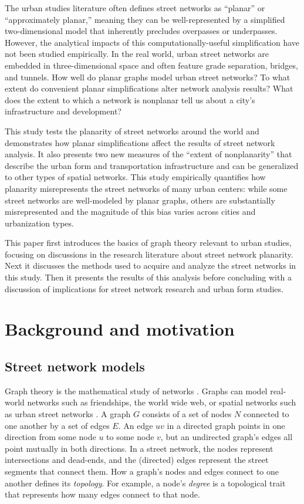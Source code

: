 \documentclass[Afour,sageh,times]{sagej}
\begin{document}
The urban studies literature often defines street networks as \enquote{planar} or \enquote{approximately planar,} meaning they can be well-represented by a simplified two-dimensional model that inherently precludes overpasses or underpasses. However, the analytical impacts of this computationally-useful simplification have not been studied empirically. In the real world, urban street networks are embedded in three-dimensional space and often feature grade separation, bridges, and tunnels. How well do planar graphs model urban street networks? To what extent do convenient planar simplifications alter network analysis results? What does the extent to which a network is nonplanar tell us about a city's infrastructure and development?

This study tests the planarity of street networks around the world and demonstrates how planar simplifications affect the results of street network analysis. It also presents two new measures of the \enquote{extent of nonplanarity} that describe the urban form and transportation infrastructure and can be generalized to other types of spatial networks. This study empirically quantifies how planarity misrepresents the street networks of many urban centers: while some street networks are well-modeled by planar graphs, others are substantially misrepresented and the magnitude of this bias varies across cities and urbanization types.

This paper first introduces the basics of graph theory relevant to urban studies, focusing on discussions in the research literature about street network planarity. Next it discusses the methods used to acquire and analyze the street networks in this study. Then it presents the results of this analysis before concluding with a discussion of implications for street network research and urban form studies.



\section{Background and motivation}

\subsection{Street network models}

Graph theory is the mathematical study of networks \citep{newman_networks:_2010}. Graphs can model real-world networks such as friendships, the world wide web, or spatial networks such as urban street networks \citep{barthelemy_spatial_2011}. A graph $G$ consists of a set of nodes $N$ connected to one another by a set of edges $E$. An edge $uv$ in a directed graph points in one direction from some node $u$ to some node $v$, but an undirected graph's edges all point mutually in both directions. In a street network, the nodes represent intersections and dead-ends, and the (directed) edges represent the street segments that connect them. How a graph's nodes and edges connect to one another defines its \emph{topology}. For example, a node's \emph{degree} is a topological trait that represents how many edges connect to that node.
\end{document}
